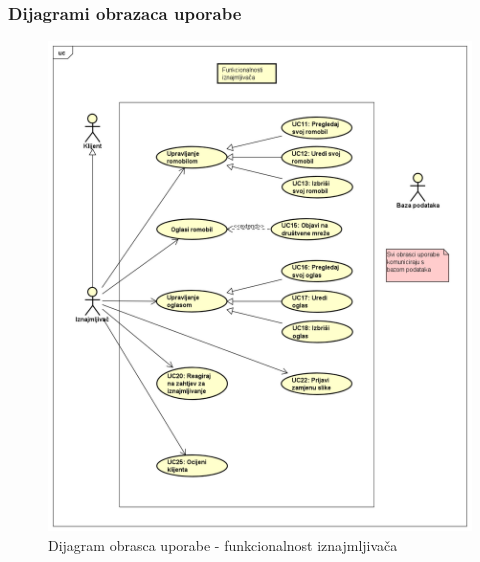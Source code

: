 					
				\subsubsection{Dijagrami obrazaca uporabe}
					
					
					
					\begin{figure} [H]
						
						\includegraphics[width=1\linewidth]{dijagrami/iznajmljivac.png}
						\centering
						\caption{Dijagram obrasca uporabe - funkcionalnost iznajmljivača}
						\label{fig:Dijagram obrasca uporabe - funkcionalnost iznajmljivača}
					\end{figure}
					
